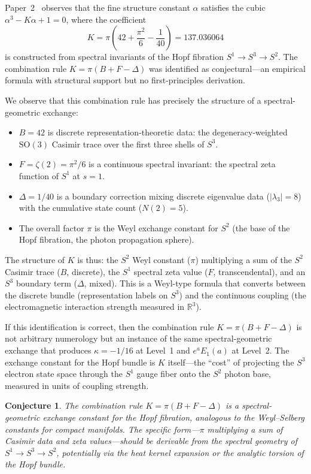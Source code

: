 \documentclass[aps,pra,twocolumn,superscriptaddress,longbibliography]{revtex4-2}
\newtheorem{conjecture}{Conjecture}
\begin{document}
Paper~2~\cite{loutey_paper2} observes that the fine structure
constant $\alpha$ satisfies the cubic $\alpha^3 - K\alpha + 1 = 0$,
where the coefficient
\begin{equation}
  K = \pi\!\left(42 + \frac{\pi^2}{6} - \frac{1}{40}\right)
  = 137.036064
  \label{eq:K}
\end{equation}
is constructed from spectral invariants of the Hopf fibration
$S^1 \to S^3 \to S^2$.  The combination rule
$K = \pi(B + F - \Delta)$ was identified as conjectural---an
empirical formula with structural support but no first-principles
derivation.

We observe that this combination rule has precisely the structure
of a spectral-geometric exchange:
\begin{itemize}
  \item $B = 42$ is discrete representation-theoretic data:
    the degeneracy-weighted $\mathrm{SO}(3)$ Casimir trace over
    the first three shells of $S^3$.
  \item $F = \zeta(2) = \pi^2/6$ is a continuous spectral
    invariant: the spectral zeta function of $S^1$ at $s = 1$.
  \item $\Delta = 1/40$ is a boundary correction mixing discrete
    eigenvalue data ($|\lambda_3| = 8$) with the cumulative state
    count ($N(2) = 5$).
  \item The overall factor $\pi$ is the Weyl exchange constant
    for $S^2$ (the base of the Hopf fibration, the photon
    propagation sphere).
\end{itemize}

The structure of $K$ is thus: the $S^2$ Weyl constant ($\pi$)
multiplying a sum of the $S^2$ Casimir trace ($B$, discrete),
the $S^1$ spectral zeta value ($F$, transcendental), and an
$S^3$ boundary term ($\Delta$, mixed).  This is a Weyl-type
formula that converts between the discrete bundle
(representation labels on $S^3$) and the continuous coupling
(the electromagnetic interaction strength measured in
$\mathbb{R}^3$).

If this identification is correct, then the combination rule
$K = \pi(B + F - \Delta)$ is not arbitrary numerology but an
instance of the same spectral-geometric exchange that produces
$\kappa = -1/16$ at Level~1 and $e^a E_1(a)$ at Level~2.
The exchange constant for the Hopf bundle is $K$ itself---the
``cost'' of projecting the $S^3$ electron state space through
the $S^1$ gauge fiber onto the $S^2$ photon base, measured
in units of coupling strength.

\begin{conjecture}
The combination rule $K = \pi(B + F - \Delta)$ is a
spectral-geometric exchange constant for the Hopf fibration,
analogous to the Weyl--Selberg constants for compact manifolds.
The specific form---$\pi$ multiplying a sum of Casimir data
and zeta values---should be derivable from the spectral geometry
of $S^1 \to S^3 \to S^2$, potentially via the heat kernel
expansion or the analytic torsion of the Hopf bundle.
\end{conjecture}
\end{document}
